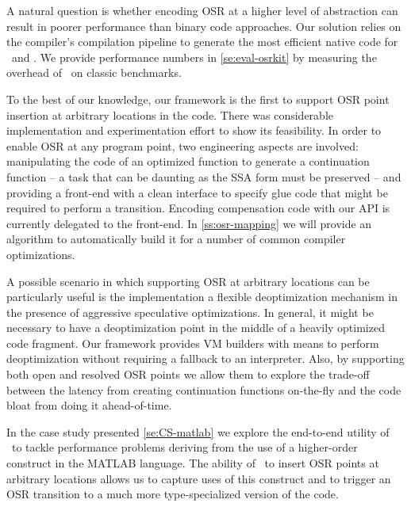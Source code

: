 \noindent A natural question is whether encoding OSR at a higher level of abstraction can result in poorer performance than binary code approaches. Our solution relies on the compiler's compilation pipeline to generate the most efficient native code for \fosrfrom\ and \fosrto. We provide performance numbers in \mysection\ref{se:eval-osrkit} by measuring the overhead of \osrkit\ on classic benchmarks.

To the best of our knowledge, our framework is the first to support OSR point insertion at arbitrary locations in the code. There was considerable implementation and experimentation effort to show its feasibility. In order to enable OSR at any program point, two engineering aspects are involved: manipulating the code of an optimized function to generate a continuation function -- a task that can be daunting as the SSA form must be preserved -- and providing a front-end with a clean interface to specify glue code that might be required to perform a transition. Encoding compensation code with our API is currently delegated to the front-end. In \mysection\ref{ss:osr-mapping} we will provide an algorithm to automatically build it for a number of common compiler optimizations.

A possible scenario in which supporting OSR at arbitrary locations can be particularly useful is the implementation a flexible deoptimization mechanism in the presence of aggressive speculative optimizations. In general, it might be necessary to have a deoptimization point in the middle of a heavily optimized code fragment. Our framework provides VM builders with means to perform deoptimization without requiring a fallback to an interpreter. Also, by supporting both open and resolved OSR points we allow them to explore the trade-off between the latency from creating continuation functions on-the-fly and the code bloat from doing it ahead-of-time.

In the case study presented \mysection\ref{se:CS-matlab} we explore the end-to-end utility of \osrkit\ to tackle performance problems deriving from the use of a higher-order construct in the MATLAB language. The ability of \osrkit\ to insert OSR points at arbitrary locations allows us to capture uses of this construct and to trigger an OSR transition to a much more type-specialized version of the code.


